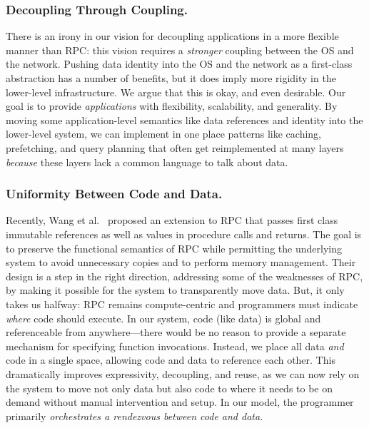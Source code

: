 \subsubsection{Decoupling Through Coupling.}
%
There is an irony in our vision for decoupling applications in a more
flexible manner than RPC: this vision requires a \emph{stronger}
coupling between the OS and the network.
Pushing data identity into the OS and the network as a first-class
abstraction has a number of benefits, but it does imply more rigidity
in the lower-level infrastructure. We argue that this is okay, and even desirable. Our
goal is to provide \emph{applications} with flexibility, scalability,
and generality. By moving some application-level semantics
like data references and identity into the lower-level system, we
can implement in one place patterns like caching, prefetching, and
query planning that often get reimplemented at many layers
\emph{because} these layers lack a common language to
talk about data.


\subsubsection{Uniformity Between Code and Data.}
%
Recently, Wang et al.~\cite{wang:hotos21} proposed an extension to RPC
that passes first class immutable references as well
as values in procedure calls and returns.  The goal is to preserve the
functional semantics of RPC while permitting the underlying system to
avoid unnecessary copies and to perform memory management.  Their
design is a step in the right direction, addressing some of the
weaknesses of RPC, by making it possible for the system
to transparently move data.  But, it only takes us halfway: RPC remains
compute-centric and programmers must indicate
\emph{where} code should execute.
In our system, code (like data) is global
and referenceable from anywhere---there would be no reason to provide a
separate mechanism for specifying function invocations. Instead, we
place all data \emph{and} code in a single space, allowing code
and data to reference each other. This dramatically improves
expressivity, decoupling, and reuse, as we can now rely on the system
to move not only data but also code to where it needs to be on demand
without manual intervention and setup. In our model, the programmer
primarily \emph{orchestrates a rendezvous between code and data}.


